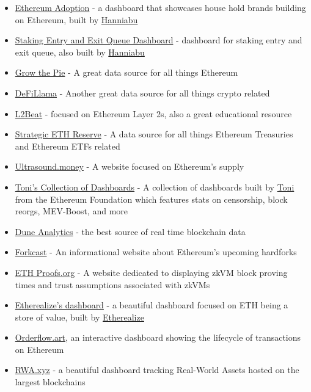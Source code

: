 \documentclass[12pt]{article}
\begin{document}
\begin{itemize}
    \item \href{https://ethereumadoption.com/built-on-ethereum/}{Ethereum Adoption} - a dashboard that showcases house hold brands building on Ethereum, built by \href{https://x.com/hanni_abu}{Hanniabu}
    \item \href{https://www.validatorqueue.com/}{Staking Entry and Exit Queue Dashboard} - dashboard for staking entry and exit queue, also built by \href{https://x.com/hanni_abu}{Hanniabu}
    \item \href{https://www.growthepie.com/}{Grow the Pie} - A great data source for all things Ethereum
    \item \href{https://defillama.com/}{DeFiLlama} - Another great data source for all things crypto related
    \item \href{https://l2beat.com/scaling/summary}{L2Beat} - focused on Ethereum Layer 2s, also a great educational resource
    \item \href{https://www.strategicethreserve.xyz/}{Strategic ETH Reserve} - A data source for all things Ethereum Treasuries and Ethereum ETFs related
    \item \href{https://ultrasound.money/?timeFrame=since_merge}{Ultrasound.money} - A website focused on Ethereum's supply
    \item \href{https://dotpics.info/}{Toni's Collection of Dashboards} - A collection of dashboards built by \href{https://x.com/nero_eth}{Toni} from the Ethereum Foundation which features stats on censorship, block reorgs, MEV-Boost, and more
    \item \href{https://dune.com/discover/content/trending}{Dune Analytics} - the best source of real time blockchain data
    \item \href{https://forkcast.org/}{Forkcast} - An informational website about Ethereum's upcoming hardforks
    \item \href{https://ethproofs.org/}{ETH Proofs.org} - A website dedicated to displaying zkVM block proving times and trust assumptions associated with zkVMs
    \item \href{https://dashboard.etherealize.com/}{Etherealize's dashboard} - a beautiful dashboard focused on ETH being a store of value, built by \href{https://x.com/Etherealize_io}{Etherealize}
    \item \href{https://orderflow.art/}{Orderflow.art}, an interactive dashboard showing the lifecycle of transactions on Ethereum
    \item \href{https://app.rwa.xyz/}{RWA.xyz} - a beautiful dashboard tracking Real-World Assets hosted on the largest blockchains

\end{itemize}
\end{document}
